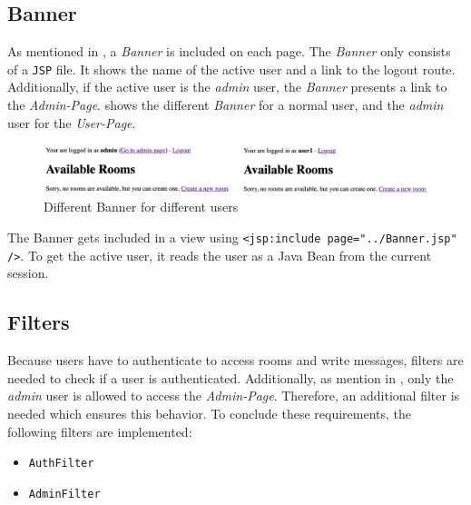 \subsection{Banner}\label{subsec:04_impl_banner}
As mentioned in , a \textit{Banner} is included on each page.
The \textit{Banner} only consists of a \texttt{JSP} file. It shows the name of the active user and a link to the logout route.
Additionally, if the active user is the \textit{admin} user, the \textit{Banner} presents a link to the \textit{Admin-Page}.
 shows the different \textit{Banner} for a normal user, and the \textit{admin} user for the \textit{User-Page}.
\begin{figure}[h]
\centering
\includegraphics[scale=0.2]{images/03_impl/banner/banner}
\caption{Different Banner for different users}
\label{fig:04_impl_banner_banner}
\end{figure}

The Banner gets included in a view using \texttt{<jsp:include page="../Banner.jsp" />}.
To get the active user, it reads the user as a Java Bean from the current session.


\subsection{Filters}\label{subsec:03_impl_filters}
Because users have to authenticate to access rooms and write messages, filters are needed to check if a user is authenticated.
Additionally, as mention in , only the \textit{admin} user is allowed to access the \textit{Admin-Page}. Therefore, an additional filter is needed which ensures this behavior.
To conclude these requirements, the following filters are implemented:
\begin{itemize}
\item \texttt{AuthFilter}
\item \texttt{AdminFilter}
\end{itemize}


